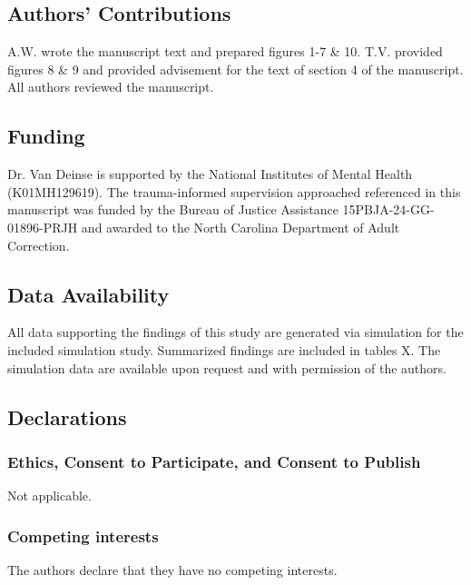 \documentclass{article}[11pt]
\begin{document}
\subsection*{Authors' Contributions}
A.W. wrote the manuscript text and prepared figures 1-7 \& 10. T.V. provided figures 8 \& 9 and provided advisement for the text of section 4 of the manuscript. All authors reviewed the manuscript.

\subsection*{Funding}
Dr. Van Deinse is supported by the National Institutes of Mental Health (K01MH129619). The trauma-informed supervision approached referenced in this manuscript was funded by the Bureau of Justice Assistance 15PBJA-24-GG-01896-PRJH and awarded to the North Carolina Department of Adult Correction.

\subsection*{Data Availability}
All data supporting the findings of this study are generated via simulation for the included simulation study. Summarized findings are included in tables X. The simulation data are available upon request and with permission of the authors.

\subsection*{Declarations}

\subsubsection*{Ethics, Consent to Participate, and Consent to Publish}
Not applicable.

\subsubsection*{Competing interests}
The authors declare that they have no competing interests.




\end{document}
